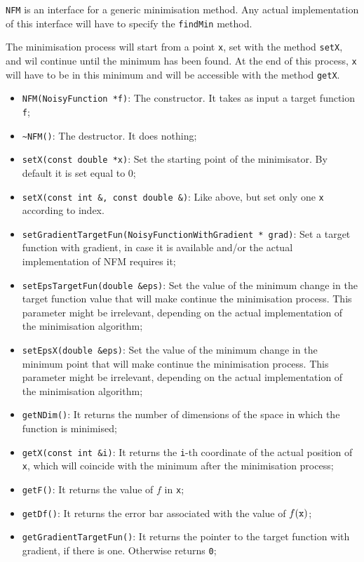 \documentclass[11pt,a4paper,twoside]{article}
\begin{document}
\verb+NFM+ is an interface for a generic minimisation method.
Any actual implementation of this interface will have to specify the \verb+findMin+ method.

The minimisation process will start from a point \verb+x+, set with the method \verb+setX+, and wil continue until the minimum has been found.
At the end of this process, \verb+x+ will have to be in this minimum and will be accessible with the method \verb+getX+.

\begin{itemize}
\item \verb+NFM(NoisyFunction *f)+: The constructor. It takes as input a target function \verb+f+;
\item \verb+~NFM()+: The destructor. It does nothing;
\item \verb+setX(const double *x)+: Set the starting point of the minimisator. By default it is set equal to $0$;
\item \verb+setX(const int &, const double &)+: Like above, but set only one \verb+x+ according to index.
\item \verb+setGradientTargetFun(NoisyFunctionWithGradient * grad)+: Set a target function with gradient, in case it is available and/or the actual implementation of NFM requires it;
\item \verb+setEpsTargetFun(double &eps)+: Set the value of the minimum change in the target function value that will make continue the minimisation process. This parameter might be irrelevant, depending on the actual implementation of the minimisation algorithm;
\item \verb+setEpsX(double &eps)+: Set the value of the minimum change in the minimum point that will make continue the minimisation process. This parameter might be irrelevant, depending on the actual implementation of the minimisation algorithm;
\item \verb+getNDim()+: It returns the number of dimensions of the space in which the function is minimised;
\item \verb+getX(const int &i)+: It returns the \verb+i+-th coordinate of the actual position of \verb+x+, which will coincide with the minimum after the minimisation process;
\item \verb+getF()+: It returns the value of $f$ in \verb+x+;
\item \verb+getDf()+: It returns the error bar associated with the value of $f(\verb+x+)$;
\item \verb+getGradientTargetFun()+: It returns the pointer to the target function with gradient, if there is one. Otherwise returns \verb+0+;

\end{itemize}
\end{document}
